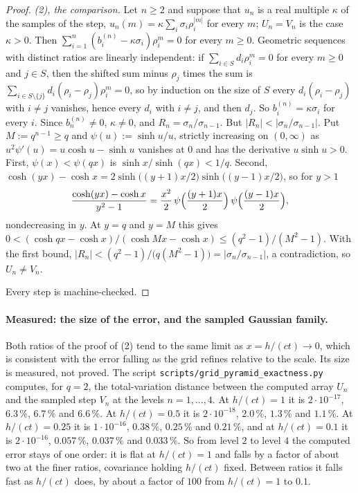 \begin{proof}
\emph{(2), the comparison.} Let $n \ge 2$ and suppose that $u_n$ is a real multiple $\kappa$ of
the samples of the step, $u_n(m) = \kappa\sum_i\sigma_i\rho_i^{|m|}$ for every $m$; $U_n = V_n$ is
the case $\kappa > 0$. Then $\sum_{i=1}^n(b^{(n)}_i - \kappa\sigma_i)\rho_i^m = 0$ for every
$m \ge 0$. Geometric sequences with distinct ratios are linearly independent: if
$\sum_{i \in S}d_i\rho_i^m = 0$ for every $m \ge 0$ and $j \in S$, then the shifted sum minus
$\rho_j$ times the sum is $\sum_{i \in S \setminus \{j\}}d_i(\rho_i - \rho_j)\rho_i^m = 0$, so by
induction on the size of $S$ every $d_i(\rho_i - \rho_j)$ with $i \ne j$ vanishes, hence every
$d_i$ with $i \ne j$, and then $d_j$. So $b^{(n)}_i = \kappa\sigma_i$ for every $i$. Since
$b^{(n)}_n \ne 0$, $\kappa \ne 0$, and $R_n = \sigma_n/\sigma_{n-1}$. But
$|R_n| < |\sigma_n/\sigma_{n-1}|$. Put $M := q^{n-1} \ge q$ and $\psi(u) := \sinh u/u$, strictly
increasing on $(0,\infty)$ as $u^2\psi'(u) = u\cosh u - \sinh u$ vanishes at $0$ and has the
derivative $u\sinh u > 0$. First, $\psi(x) < \psi(qx)$ is $\sinh x/\sinh(qx) < 1/q$. Second,
$\cosh(yx) - \cosh x = 2\sinh\bigl((y+1)x/2\bigr)\sinh\bigl((y-1)x/2\bigr)$, so for $y > 1$
\[
  \frac{\cosh(yx) - \cosh x}{y^2 - 1}
  = \frac{x^2}{2}\,\psi\Bigl(\frac{(y+1)x}{2}\Bigr)\,\psi\Bigl(\frac{(y-1)x}{2}\Bigr) ,
\]
nondecreasing in $y$. At $y = q$ and $y = M$ this gives
$0 < (\cosh qx - \cosh x)/(\cosh Mx - \cosh x) \le (q^2 - 1)/(M^2 - 1)$. With the first bound,
$|R_n| < (q^2 - 1)/\bigl(q(M^2 - 1)\bigr) = |\sigma_n/\sigma_{n-1}|$, a contradiction, so
$U_n \ne V_n$.

Every step is machine-checked.
\end{proof}

\paragraph{Measured: the size of the error, and the sampled Gaussian family.} Both ratios of the
proof of (2) tend to the same limit as $x = h/(ct) \to 0$, which is consistent with the error
falling as the grid refines relative to the scale. Its size is measured, not proved. The script
\texttt{scripts/grid\_pyramid\_exactness.py} computes, for $q = 2$, the total-variation distance
between the computed array $U_n$ and the sampled step $V_n$ at the levels $n = 1, \dots, 4$. At
$h/(ct) = 1$ it is $2\cdot10^{-17}$, $6.3\,\%$, $6.7\,\%$ and $6.6\,\%$. At $h/(ct) = 0.5$ it is
$2\cdot10^{-18}$, $2.0\,\%$, $1.3\,\%$ and $1.1\,\%$. At $h/(ct) = 0.25$ it is $1\cdot10^{-16}$,
$0.38\,\%$, $0.25\,\%$ and $0.21\,\%$, and at $h/(ct) = 0.1$ it is $2\cdot10^{-16}$, $0.057\,\%$,
$0.037\,\%$ and $0.033\,\%$. So from level $2$ to level $4$ the computed error stays of one order:
it is flat at $h/(ct) = 1$ and falls by a factor of about two at the finer ratios, covariance holding
$h/(ct)$ fixed. Between ratios it falls fast as $h/(ct)$ does, by about a factor of $100$ from
$h/(ct) = 1$ to $0.1$.

